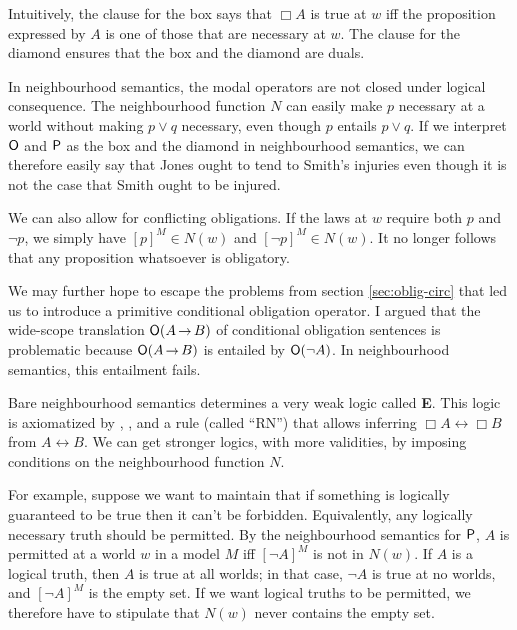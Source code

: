 Intuitively, the clause for the box says that $\Box A$ is true at $w$ iff the
proposition expressed by $A$ is one of those that are necessary at $w$. The
clause for the diamond ensures that the box and the diamond are duals.

In neighbourhood semantics, the modal operators are not closed under logical
consequence. The neighbourhood function $N$ can easily make $p$ necessary at a
world without making $p\lor q$ necessary, even though $p$ entails $p \lor q$.
If we interpret $\operatorname{\mathsf{O}}$ and $\operatorname{\mathsf{P}}$ as the box and the diamond in neighbourhood
semantics, we can therefore easily say that Jones ought to tend to Smith's
injuries even though it is not the case that Smith ought to be injured.


We can also allow for conflicting obligations. If the laws at $w$ require both
$p$ and $\neg p$, we simply have $[p]^M \in N(w)$ and $[\neg p]^M \in N(w)$. It
no longer follows that any proposition whatsoever is obligatory.

We may further hope to escape the problems from section \ref{sec:oblig-circ}
that led us to introduce a primitive conditional obligation operator. I argued
that the wide-scope translation $\Ob(A \to B)$ of conditional obligation
sentences is problematic because $\Ob(A \to B)$ is entailed by $\operatorname{\mathsf{O}}(\neg A)$. In
neighbourhood semantics, this entailment fails. 

Bare neighbourhood semantics determines a very weak logic called \textbf{E}.
This logic is axiomatized by , , and a rule (called ``RN'')
that allows inferring $\Box A \leftrightarrow \Box B$ from
$A \leftrightarrow B$. We can get stronger logics, with more validities, by
imposing conditions on the neighbourhood function $N$.

For example, suppose we want to maintain that if something is logically
guaranteed to be true then it can't be forbidden. Equivalently, any logically
necessary truth should be permitted. By the neighbourhood semantics for $\operatorname{\mathsf{P}}$,
$A$ is permitted at a world $w$ in a model $M$ iff $[\neg A]^M$ is not in
$N(w)$. If $A$ is a logical truth, then $A$ is true at all worlds; in that case,
$\neg A$ is true at no worlds, and $[\neg A]^M$ is the empty set. If we want
logical truths to be permitted, we therefore have to stipulate that $N(w)$
never contains the empty set.

